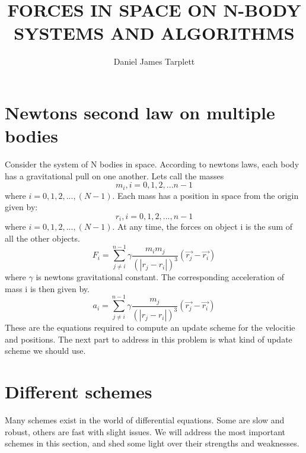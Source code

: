 \documentclass{article}
\author{Daniel James Tarplett}
\title{FORCES IN SPACE ON N-BODY SYSTEMS AND ALGORITHMS}
\begin{document}
\maketitle

\section{Newtons second law on multiple bodies}
Consider the system of N bodies in space. According to newtons laws, each body has a gravitational pull on one another. Lets call the masses
\[m_i, i=0,1,2,...n-1\]
where $i=0,1,2,...,(N-1)$. Each mass has a position in space from the origin given by:
\[r_i, i=0,1,2,...,n-1\]
where $i=0,1,2,...,(N-1)$. At any time, the forces on object i is the sum of all the other objects.
\begin{equation}
F_i = \sum_{j \neq i}^{n-1}\gamma \frac{m_im_j}{(|r_j-r_i|)^3}(\vec{r_j} - \vec{r_i})
\end{equation}
where $\gamma$ is newtons gravitational constant. The corresponding acceleration of mass i is then given by.
\begin{equation}
a_i = \sum_{j \neq i}^{n-1}\gamma \frac{m_j}{(|r_j-r_i|)^3}(\vec{r_j} - \vec{r_i})
\end{equation}
These are the equations required to compute an update scheme for the velocitie and positions. The next part to address in this problem is what kind of update scheme we should use.
\section{Different schemes}
Many schemes exist in the world of differential equations. Some are slow and robust, others are fast with slight issues. We will address the most important schemes in this section, and shed some light over their strengths and weaknesses.
\end{document}
